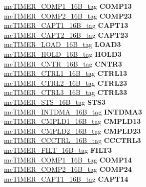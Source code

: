 \begin{DoxyCompactItemize}
\begin{tabbing}
\>\>\mbox{\hyperlink{unionmcTIMER__COMP1__16B__tag}{mcTIMER\_COMP1\_16B\_tag}} {\bfseries COMP13}\\
\>\>\mbox{\hyperlink{unionmcTIMER__COMP2__16B__tag}{mcTIMER\_COMP2\_16B\_tag}} {\bfseries COMP23}\\
\>\>\mbox{\hyperlink{unionmcTIMER__CAPT1__16B__tag}{mcTIMER\_CAPT1\_16B\_tag}} {\bfseries CAPT13}\\
\>\>\mbox{\hyperlink{unionmcTIMER__CAPT2__16B__tag}{mcTIMER\_CAPT2\_16B\_tag}} {\bfseries CAPT23}\\
\>\>\mbox{\hyperlink{unionmcTIMER__LOAD__16B__tag}{mcTIMER\_LOAD\_16B\_tag}} {\bfseries LOAD3}\\
\>\>\mbox{\hyperlink{unionmcTIMER__HOLD__16B__tag}{mcTIMER\_HOLD\_16B\_tag}} {\bfseries HOLD3}\\
\>\>\mbox{\hyperlink{unionmcTIMER__CNTR__16B__tag}{mcTIMER\_CNTR\_16B\_tag}} {\bfseries CNTR3}\\
\>\>\mbox{\hyperlink{unionmcTIMER__CTRL1__16B__tag}{mcTIMER\_CTRL1\_16B\_tag}} {\bfseries CTRL13}\\
\>\>\mbox{\hyperlink{unionmcTIMER__CTRL2__16B__tag}{mcTIMER\_CTRL2\_16B\_tag}} {\bfseries CTRL23}\\
\>\>\mbox{\hyperlink{unionmcTIMER__CTRL3__16B__tag}{mcTIMER\_CTRL3\_16B\_tag}} {\bfseries CTRL33}\\
\>\>\mbox{\hyperlink{unionmcTIMER__STS__16B__tag}{mcTIMER\_STS\_16B\_tag}} {\bfseries STS3}\\
\>\>\mbox{\hyperlink{unionmcTIMER__INTDMA__16B__tag}{mcTIMER\_INTDMA\_16B\_tag}} {\bfseries INTDMA3}\\
\>\>\mbox{\hyperlink{unionmcTIMER__CMPLD1__16B__tag}{mcTIMER\_CMPLD1\_16B\_tag}} {\bfseries CMPLD13}\\
\>\>\mbox{\hyperlink{unionmcTIMER__CMPLD2__16B__tag}{mcTIMER\_CMPLD2\_16B\_tag}} {\bfseries CMPLD23}\\
\>\>\mbox{\hyperlink{unionmcTIMER__CCCTRL__16B__tag}{mcTIMER\_CCCTRL\_16B\_tag}} {\bfseries CCCTRL3}\\
\>\>\mbox{\hyperlink{unionmcTIMER__FILT__16B__tag}{mcTIMER\_FILT\_16B\_tag}} {\bfseries FILT3}\\
\>\>\mbox{\hyperlink{unionmcTIMER__COMP1__16B__tag}{mcTIMER\_COMP1\_16B\_tag}} {\bfseries COMP14}\\
\>\>\mbox{\hyperlink{unionmcTIMER__COMP2__16B__tag}{mcTIMER\_COMP2\_16B\_tag}} {\bfseries COMP24}\\
\>\>\mbox{\hyperlink{unionmcTIMER__CAPT1__16B__tag}{mcTIMER\_CAPT1\_16B\_tag}} {\bfseries CAPT14}\\

\end{tabbing}
\end{DoxyCompactItemize}
